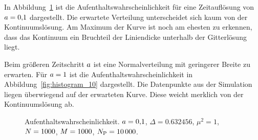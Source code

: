 In Abbildung~\ref{fig:histogram_01} ist die Aufenthaltswahrscheinlichkeit für
eine Zeitauflösung von $a = \num{0.1}$ dargestellt. Die erwartete
Verteilung unterscheidet sich kaum von der Kontinuumslösung. Am Maximum der
Kurve ist noch am ehesten zu erkennen, dass das Kontinuum ein Bruchteil der
Liniendicke unterhalb der Gitterlösung liegt.

Beim größeren Zeitschritt $a$ ist eine Normalverteilung mit geringerer
Breite zu erwarten. Für $a = \num{1}$ ist die
Aufenthaltswahrscheinlichkeit in Abbildung~\ref{fig:histogram_10} dargestellt.
Die Datenpunkte aus der Simulation liegen überwiegend auf der erwarteten Kurve.
Diese weicht merklich von der Kontinuumslösung ab.

\begin{figure}[htbp]
    \centering
    \caption{%
        Aufenthaltswahrscheinlichkeit. $a =
        \num{0.1}$, $\Delta = \num{0.632456}$, $\mu^2 = \num{1}$, $N =
        \num{1000}$, $M = \num{1000}$, $N_\text P = \num{10000}$.
    }
    \label{fig:histogram_01}
\end{figure}

